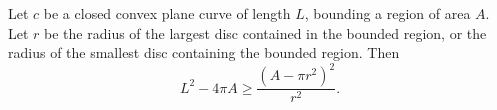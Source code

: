 Let $c$ be a closed convex plane curve of length $L$, bounding a region of area $A$. Let $r$ be the radius of the largest disc contained in the bounded region, or the radius of the smallest disc containing the bounded region. Then
$$L^2 - 4\pi A \geq \frac{(A - \pi r^2)^2}{r^2}.$$